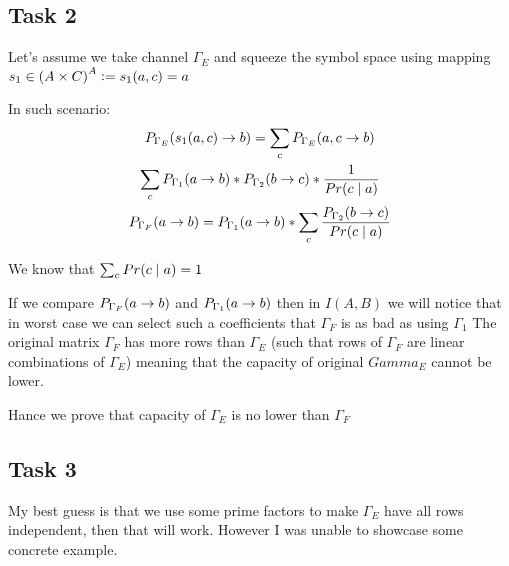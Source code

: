 \subsection{Task 2}

Let's assume we take channel $\Gamma_E$ and squeeze the symbol space using mapping $s_1 \in {(A \times C)}^{A} \vcentcolon= s_1(a,c) = a$

In such scenario:
\begin{gather*}
\prtf{\Gamma_E}{s_1(a,c)}{b} = \sum_{c}{ \prtf{\Gamma_E}{a,c}{b} } \\
\sum_{c}{ \prtf{\Gamma_1}{a}{b} * \prtf{\Gamma_2}{b}{c} * \frac{ 1 }{ \prob{c}[a] } } \\
\prtf{\Gamma_F}{a}{b} = \prtf{\Gamma_1}{a}{b}  * \sum_{c}{ \frac{ \prtf{\Gamma_2}{b}{c} }{ \prob{c}[a] } } 
\end{gather*}

We know that $\sum_{c}{\prob{c}[a]} = 1$

If we compare $\prtf{\Gamma_F}{a}{b}$ and $\prtf{\Gamma_1}{a}{b}$ then in $I(A,B)$ we will notice that in worst case we can select such a coefficients that $\Gamma_F$ is as bad as using $\Gamma_1$
The original matrix $\Gamma_F$ has more rows than $\Gamma_E$ (such that rows of $\Gamma_F$ are linear combinations of $\Gamma_E$) meaning that the capacity of original $Gamma_E$ cannot be lower.

Hance we prove that capacity of $\Gamma_E$ is no lower than $\Gamma_F$

\subsection{Task 3}

My best guess is that we use some prime factors to make $\Gamma_E$ have all rows independent, then that will work. However I was unable to showcase some concrete example.


